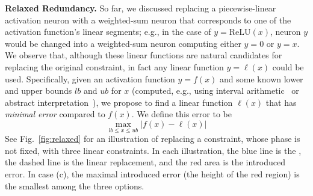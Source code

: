 \documentclass[10pt, conference, twocolumn, compsocconf]{IEEEtran}
\theoremstyle{remark}
\newcommand{\relu}{\text{ReLU}\xspace}
\begin{document}
\medskip
\noindent
\textbf{Relaxed Redundancy.}  So far, we discussed replacing a
piecewise-linear activation neuron with a weighted-sum neuron that
corresponds to one of the activation function's linear segments; e.g.,
in the case of $y=\relu{}(x)$, neuron $y$ would be changed into a
weighted-sum neuron computing either $y=0$ or $y=x$.  We observe that,
although these linear functions are natural candidates for replacing
the original constraint, in fact any linear function $y=\ell(x)$ could
be used. Specifically, given an activation function $y=f(x)$ and some
known lower and upper bounds $lb$ and $ub$ for $x$ (computed, e.g.,
using interval arithmetic~\cite{KaBaDiJuKo17} or abstract
interpretation~\cite{WaPeWhYaJa18,GeMiDrTsChVe18}), we propose to find
a linear function $\ell(x)$ that has \emph{minimal error} compared to
$f(x)$.  We define this error to be
\[
  \max_{lb\leq x\leq ub}|f(x)-\ell(x)|
  \]
See Fig.~\ref{fig:relaxed} for an
illustration of replacing a \relu{} constraint, whose phase is not fixed,
with three linear constraints. In each illustration, the blue line is
the \relu{}, the dashed line is the linear replacement, and the red
area is the introduced error. In case (c), the maximal introduced error (the
height of the red region) is the smallest among the three options.
\end{document}

